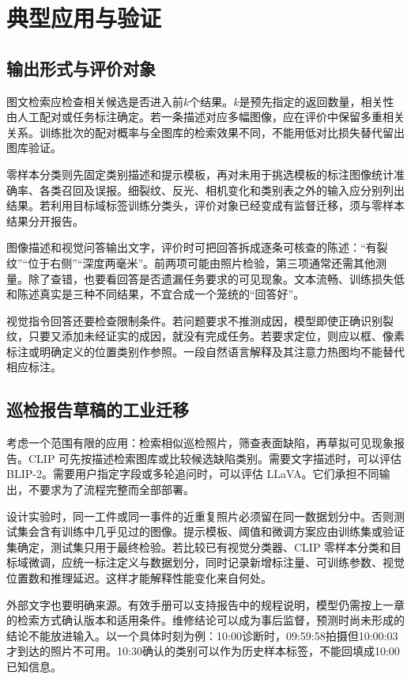 \section{典型应用与验证}
\subsection{输出形式与评价对象}
图文检索应检查相关候选是否进入前$k$个结果。$k$是预先指定的返回数量，相关性由人工配对或任务标注确定。若一条描述对应多幅图像，应在评价中保留多重相关关系。训练批次的配对概率与全图库的检索效果不同，不能用低对比损失替代留出图库验证。

零样本分类则先固定类别描述和提示模板，再对未用于挑选模板的标注图像统计准确率、各类召回及误报。细裂纹、反光、相机变化和类别表之外的输入应分别列出结果。若利用目标域标签训练分类头，评价对象已经变成有监督迁移，须与零样本结果分开报告。

图像描述和视觉问答输出文字，评价时可把回答拆成逐条可核查的陈述：“有裂纹”“位于右侧”“深度两毫米”。前两项可能由照片检验，第三项通常还需其他测量。除了查错，也要看回答是否遗漏任务要求的可见现象。文本流畅、训练损失低和陈述真实是三种不同结果，不宜合成一个笼统的“回答好”。

视觉指令回答还要检查限制条件。若问题要求不推测成因，模型即使正确识别裂纹，只要又添加未经证实的成因，就没有完成任务。若要求定位，则应以框、像素标注或明确定义的位置类别作参照。一段自然语言解释及其注意力热图均不能替代相应标注。

\subsection{巡检报告草稿的工业迁移}
考虑一个范围有限的应用：检索相似巡检照片，筛查表面缺陷，再草拟可见现象报告。CLIP 可先按描述检索图库或比较候选缺陷类别。需要文字描述时，可以评估 BLIP-2。需要用户指定字段或多轮追问时，可以评估 LLaVA。它们承担不同输出，不要求为了流程完整而全部部署。

设计实验时，同一工件或同一事件的近重复照片必须留在同一数据划分中。否则测试集会含有训练中几乎见过的图像。提示模板、阈值和微调方案应由训练集或验证集确定，测试集只用于最终检验。若比较已有视觉分类器、CLIP 零样本分类和目标域微调，应统一标注定义与数据划分，同时记录新增标注量、可训练参数、视觉位置数和推理延迟。这样才能解释性能变化来自何处。

外部文字也要明确来源。有效手册可以支持报告中的规程说明，模型仍需按上一章的检索方式确认版本和适用条件。维修结论可以成为事后监督，预测时尚未形成的结论不能放进输入。以一个具体时刻为例：10:00诊断时，09:59:58拍摄但10:00:03才到达的照片不可用。10:30确认的类别可以作为历史样本标签，不能回填成10:00已知信息。

